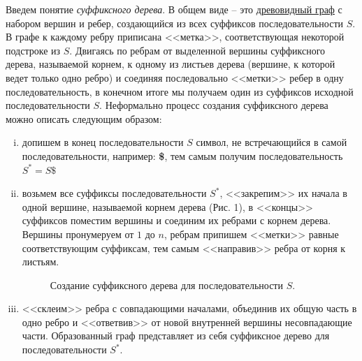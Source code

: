 \documentclass[letterpaper, 11pt]{article}
\begin{document}
Введем понятие \textit{суффиксного дерева}. В общем виде -- это \href{https://goo.gl/VwAiep}{древовидный граф} с набором вершин и ребер, создающийся из всех суффиксов последовательности $S$. В графе к каждому ребру приписана <<метка>>, соответствующая некоторой подстроке из $S$. Двигаясь по ребрам от выделенной вершины суффиксного дерева, называемой корнем, к одному из листьев дерева (вершине, к которой ведет только одно ребро) и соединяя последовально <<метки>> ребер в одну последовательность, в конечном итоге мы получаем один из суффиксов исходной последовательности $S$. Неформально процесс создания суффиксного дерева можно описать следующим образом:
\begin{enumerate}[(i)]
\item
допишем в конец последовательности $S$ символ, не встречающийся в самой последовательности, например: \textbf{\$}, тем самым получим последовательность $S^{*} = S\$$
\item
возьмем все суффиксы последовательности $S^{*}$, <<закрепим>> их начала в одной вершине, называемой корнем дерева (Рис. 1), в <<концы>> суффиксов поместим вершины и соединим их ребрами с корнем дерева. Вершины пронумеруем от $1$ до $n$, ребрам припишем <<метки>> равные соответствующим суффиксам, тем самым <<направив>> ребра от корня к листьям.

\begin{figure}[H]
  \caption{Создание суффиксного дерева для последовательности $S$.}
\end{figure}

\item
<<склеим>> ребра с совпадающими началами, объединив их общую часть в одно ребро и <<ответвив>> от новой внутренней вершины несовпадающие части. Образованный граф представляет из себя суффиксное дерево для последовательности $S^*$.
\end{enumerate}
\end{document}
